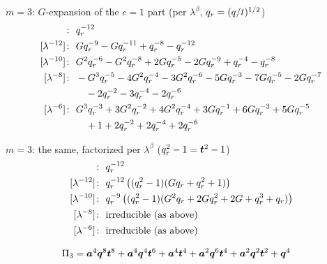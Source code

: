 $m = 3$: $G$-expansion of the $c = 1$ part (per $\lambda^\beta$, $q_r = (q/t)^{1/2}$)
\begin{align*}
[\lambda^{-14}]\colon\ & \qr^{-12} \\
[\lambda^{-12}]\colon\ & G \qr^{-9} -G \qr^{-11} +\qr^{-8} -\qr^{-12} \\
[\lambda^{-10}]\colon\ & G^{2} \qr^{-6} -G^{2} \qr^{-8} +2 G \qr^{-5} -2 G \qr^{-9} +\qr^{-4} -\qr^{-8} \\
[\lambda^{-8}]\colon\ & -G^{3} \qr^{-5} -4 G^{2} \qr^{-4} -3 G^{2} \qr^{-6} -5 G \qr^{-3} -7 G \qr^{-5} -2 G \qr^{-7} \\
& \quad -2 \qr^{-2} -3 \qr^{-4} -2 \qr^{-6} \\
[\lambda^{-6}]\colon\ & G^{3} \qr^{-3} +3 G^{2} \qr^{-2} +4 G^{2} \qr^{-4} +3 G \qr^{-1} +6 G \qr^{-3} +5 G \qr^{-5} \\
& \quad +1 +2 \qr^{-2} +2 \qr^{-4} +2 \qr^{-6}
\end{align*}

$m = 3$: the same, factorized per $\lambda^\beta$ ($q_r^2 - 1 = \bm{t}^2 - 1$)
\begin{align*}
[\lambda^{-14}]\colon\ & \qr^{-12} \\
[\lambda^{-12}]\colon\ & \qr^{-12}\,\bigl((\qr^2 - 1)(G \qr + \qr^{2} + 1)\bigr) \\
[\lambda^{-10}]\colon\ & \qr^{-9}\,\bigl((\qr^2 - 1)(G^{2} \qr + 2 G \qr^{2} + 2 G + \qr^{3} + \qr)\bigr) \\
[\lambda^{-8}]\colon\ & \text{irreducible (as above)} \\
[\lambda^{-6}]\colon\ & \text{irreducible (as above)}
\end{align*}

\begin{align*}
\Pi_{3} &= \bm{a}^{4} \bm{q}^{8} \bm{t}^{8} +\bm{a}^{4} \bm{q}^{4} \bm{t}^{6} +\bm{a}^{4} \bm{t}^{4} +\bm{a}^{2} \bm{q}^{6} \bm{t}^{4} +\bm{a}^{2} \bm{q}^{2} \bm{t}^{2} +\bm{q}^{4}
\end{align*}
